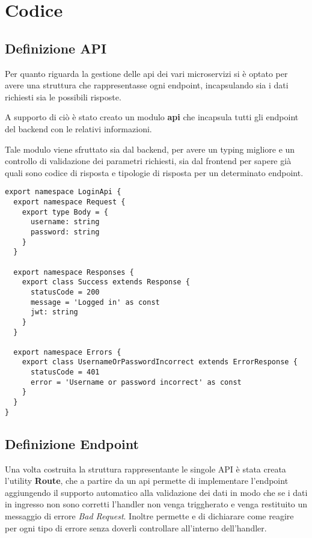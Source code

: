 \chapter{Codice}

\section{Definizione API}

Per quanto riguarda la gestione delle api dei vari microservizi si è optato per avere una struttura che rappresentasse ogni endpoint, incapsulando sia i dati richiesti sia le possibili risposte.

A supporto di ciò è stato creato un modulo \textbf{api} che incapsula tutti gli endpoint del backend con le relativi informazioni.

Tale modulo viene sfruttato sia dal backend, per avere un typing migliore e un controllo di validazione dei parametri richiesti, sia dal frontend per sapere già quali sono codice di risposta e tipologie di risposta per un determinato endpoint.

\begin{lstlisting}[style=typescript, caption={Definizione API}, label=lst:login:api]
export namespace LoginApi {
  export namespace Request {
    export type Body = {
      username: string
      password: string
    }
  }

  export namespace Responses {
    export class Success extends Response {
      statusCode = 200
      message = 'Logged in' as const
      jwt: string
    }
  }

  export namespace Errors {
    export class UsernameOrPasswordIncorrect extends ErrorResponse {
      statusCode = 401
      error = 'Username or password incorrect' as const
    }
  }
}
\end{lstlisting}

\section{Definizione Endpoint}

Una volta costruita la struttura rappresentante le singole API è stata creata l'utility \textbf{Route}, che a partire da un api permette di implementare l'endpoint aggiungendo il supporto automatico alla validazione dei dati in modo che se i dati in ingresso non sono corretti l'handler non venga triggherato e venga restituito un messaggio di errore \textit{Bad Request}.
%
Inoltre permette e di dichiarare come reagire per ogni tipo di errore senza doverli controllare all'interno dell'handler.

